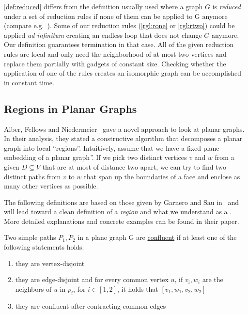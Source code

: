 \cref{def:reduced} differs from the definition usually used where a graph $G$ is \textit{reduced} under a set of reduction rules if none of them can be applied to G anymore (compare e.g.~\cite{Fomin2019}). Some of our reduction rules (\cref{rgl:rone} or \cref{rgl:rtwo}) could be applied \textit{ad infinitum} creating an endless loop that does not change $G$ anymore. Our definition guarantees termination in that case. All of the given reduction rules are local and only need the neighborhood of at most two vertices and replace them partially with gadgets of constant size. Checking whether the application of one of the rules creates an isomorphic graph can be accomplished in constant time.

\subsection{Regions in Planar Graphs}

Alber, Fellows and Niedermeier~\cite{Alber2004} gave a novel approach to look at planar graphs. In their analysis, they stated a constructive algorithm that decomposes a planar graph into local ``regions''. Intuitively, assume that we have a fixed plane embedding of a planar graph \G. If we pick two distinct vertices $v$ and $w$ from a given \sdom $D \subseteq V$ that are at most of distance two apart, we can try to find two distinct paths from $v$ to $w$ that span up the boundaries of a face and enclose as many other vertices as possible. 

The following definitions are based on those given by Garnero and Sau in~\cite[arXiv v2]{Garnero2018} and will lead toward a clean definition of a \textit{region} and what we understand as a \dreg. More detailed explanations and concrete examples can be found in their paper.

\begin{definition}
    Two simple paths $P_1, P_2$ in a plane graph G are \underline{confluent} if at least one of the following statements holds:
    
    \begin{enumerate}
        \item they are vertex-disjoint
        \item they are edge-disjoint and for every common vertex $u$, if $v_i, w_i$ are the neighbors of $u$ in $p_i$, for $i \in [1,2]$, it holds that $[v_1, w_1, v_2, w_2]$
        \item they are confluent after contracting common edges
    \end{enumerate}
\end{definition}

